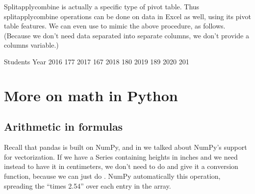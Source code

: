 \documentclass[letterpaper,10pt,english]{jupyterBook}
\begin{document}
\sphinxAtStartPar
Split\sphinxhyphen{}apply\sphinxhyphen{}combine is actually a specific type of pivot table.  Thus split\sphinxhyphen{}apply\sphinxhyphen{}combine operations can be done on data in Excel as well, using its pivot table features.  We can even use  to mimic the above procedure, as follows.  (Because we don’t need data separated into separate columns, we don’t provide a columns variable.)

\begin{sphinxVerbatim}[commandchars=\\\{\}]
 \PYG{p}{[}\PYG{p}{]} \PYG{p}{[}\PYG{p}{]}   
\end{sphinxVerbatim}

\begin{sphinxVerbatim}[commandchars=\\\{\}]
      \PYGZsh{} Students
Year            
2016         177
2017         167
2018         180
2019         189
2020         201
\end{sphinxVerbatim}


\section{More on math in Python}
\label{\detokenize{chapter-11-processing-rows:more-on-math-in-python}}

\subsection{Arithmetic in formulas}
\label{\detokenize{chapter-11-processing-rows:arithmetic-in-formulas}}
\sphinxAtStartPar
Recall that pandas is built on NumPy, and in {\hyperref[\detokenize{chapter-9-math-and-stats::doc}]{}} we talked about NumPy’s support for vectorization.  If we have a Series  containing heights in inches and we need instead to have it in centimeters, we don’t need to do  and give it a conversion function, because we can just do .  NumPy automatically  this operation, spreading the “times 2.54” over each entry in the  array.
\end{document}
